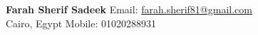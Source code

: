 \textbf{{\LARGE Farah Sherif Sadeek}} \hfill Email: \href{mailto:farah.sherif81@gmail.com}{farah.sherif81@gmail.com}\\
Cairo, Egypt \hfill Mobile: 01020288931 \\